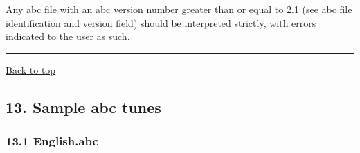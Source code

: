 Any \protect\hyperlink{abc_file_definition}{abc file} with an abc
version number greater than or equal to 2.1 (see
\protect\hyperlink{abc_file_identification}{abc file identification} and
\protect\hyperlink{version_field}{version field}) should be interpreted
strictly, with errors indicated to the user as such.

\begin{center}\rule{0.5\linewidth}{\linethickness}\end{center}

\protect\hyperlink{}{Back to top}

\hypertarget{sample_abc_tunes}{\subsection{13. Sample abc
tunes}\label{sample_abc_tunes}}

\hypertarget{englishabc}{\subsubsection{13.1
English.abc}\label{englishabc}}

